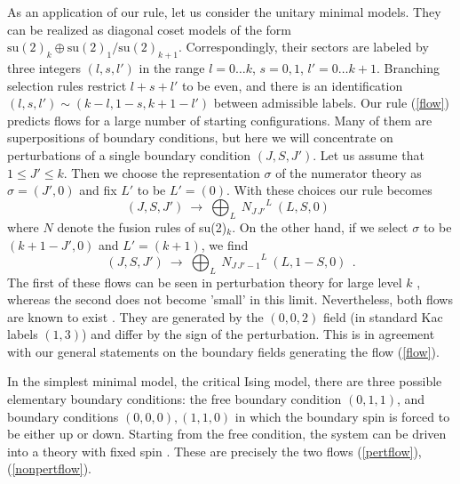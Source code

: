 \documentclass[a4paper,prd,twocolumn,nobibnotes,amssymb,preprintnumbers]{revtex4}
\begin{document}
As an application of our rule, let us consider the unitary minimal
models. They can be realized as diagonal coset models of the form 
$\text{su} (2)_{k}\oplus \text{su} (2)_{1}/\text{su} (2)_{k+1}$. 
Correspondingly, their sectors are labeled by three integers 
$(l,s,l')$ in the range $l=0\dots k$, $s=0,1$, $l'=0\dots k+1$. 
Branching selection rules restrict $l+s+l'$ to be even, and there 
is an identification  $(l,s,l')\sim (k-l,1-s,k+1-l')$ between 
admissible labels. Our rule (\ref{flow}) predicts flows for a 
large number of starting configurations. Many of them are 
superpositions of boundary conditions, but here we will concentrate 
on perturbations of a single boundary condition $(J,S,J')$. Let us 
assume that $1\leq J' \leq k$. Then we choose the representation
$\sigma$ of the numerator theory as $\sigma = (J',0)$ and fix $L'$ 
to be $L'=(0)$. With these choices our rule becomes 
\begin{equation}\label{pertflow}
(J,S,J')\ \longrightarrow\ \bigoplus_{L}\ 
{N_{J\, J'}}^{L}\ (L,S,0)\ \ 
\end{equation}
where $N$ denote the fusion rules of su(2)$_k$.
On the other hand, if we select $\sigma $ to be $(k+1-J',0)$ and 
$L' = (k+1)$, we find
\begin{equation}\label{nonpertflow}
(J,S,J')\ \longrightarrow\ \bigoplus_{L}\ 
{N_{J\,J'-1}}^{L}\ (L,1-S,0)\ \ .
\end{equation}
The first of these flows can be seen in perturbation theory for large
level $k$ \cite{Recknagel:2000ri,Graham:2001pp}, whereas the second 
does not become 'small' in this limit. Nevertheless, both flows are 
known to exist \cite{Chim:1996kf,Lesage:1998qf,Ahn:1998xm}. They 
are generated by the $(0,0,2)$ field (in standard Kac labels $(1,3)$) 
and differ by the sign of the perturbation. This is in agreement with 
our general statements on the boundary fields generating the flow 
(\ref{flow}). 
\smallskip

In the simplest minimal model, the critical Ising model, there are
three possible elementary boundary conditions: the free boundary 
condition $(0,1,1)$, and boundary conditions $(0,0,0),(1,1,0)$ in 
which the boundary spin is forced to be either up or down. Starting 
from the free condition, the system can be driven into a theory with 
fixed spin \cite{Ghoshal:1994tm}. These are precisely the two flows 
(\ref{pertflow}), (\ref{nonpertflow}).
\end{document}
